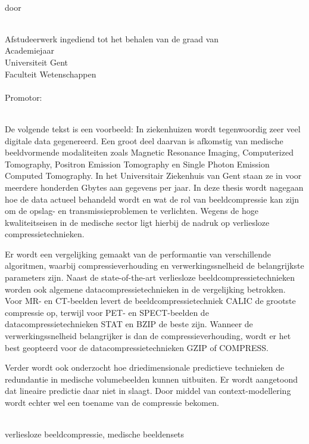 \newpage
\thispagestyle{plain}

\begin{center}
{\bf \titel }\\[3mm]
door\\
\auteur{} \\
\end{center}
\noindent Afstudeerwerk ingediend tot het behalen van de graad van
\richting
\vspace{3mm}\\
Academiejaar \jaar
\vspace{3mm}\\
\noindent Universiteit Gent\\
Faculteit Wetenschappen\\
\vspace{3mm}\\
\noindent Promotor: \promotor\\
\vfill

\\[1mm]
De volgende tekst is een voorbeeld: In ziekenhuizen wordt tegenwoordig
zeer veel digitale data 
gegenereerd. Een groot deel daarvan is afkomstig van medische
beeldvormende modaliteiten zoals Magnetic Resonance Imaging,
Computerized Tomography, Positron Emission Tomography en Single Photon
Emission Computed Tomography. In het Universitair Ziekenhuis van Gent
staan ze in voor meerdere honderden Gbytes aan gegevens per jaar. In
deze thesis wordt nagegaan hoe de data actueel behandeld wordt en wat
de rol van beeldcompressie kan zijn om de opslag- en
transmissieproblemen te verlichten. Wegens de hoge kwaliteitseisen in
de medische sector ligt hierbij de nadruk op verliesloze
compressietechnieken.

Er wordt een vergelijking gemaakt van de performantie van
verschillende algoritmen, waarbij compressieverhouding en
verwerkingssnelheid de belangrijkste parameters zijn. Naast de
state-of-the-art verliesloze beeldcompressietechnieken worden ook
algemene data\-compressietechnieken in de vergelijking betrokken.
Voor MR- en CT-beelden levert de beeldcompressietechniek CALIC de
grootste compressie op, terwijl voor PET- en SPECT-beelden de
datacompressietechnieken STAT en BZIP de beste zijn. Wanneer de
verwer\-kingssnelheid belangrijker is dan de compressieverhouding,
wordt er het best geopteerd voor de datacompressietechnieken GZIP of
COMPRESS.

Verder wordt ook onderzocht hoe driedimensionale predictieve
technieken de redundantie in medische volumebeelden kunnen
uitbuiten. Er wordt aangetoond dat lineaire predictie daar niet in
slaagt. Door middel van context-modellering wordt echter wel een
toename van de compressie bekomen.


\vspace{5mm}

\\[1mm]
verliesloze beeldcompressie, medische beeldensets

